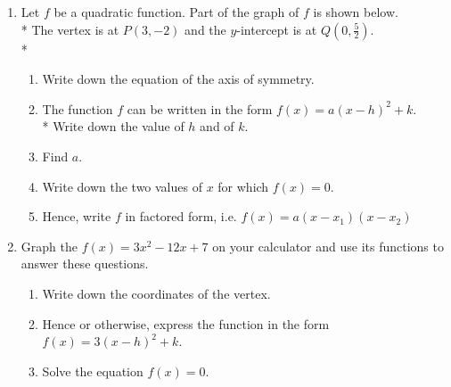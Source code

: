\documentclass[12pt, twoside]{article}
\begin{document}
\begin{enumerate}%
\subsubsection*{5.3 Do Now: Completing the square of quadratic functions}
  \item Let $f$ be a quadratic function. Part of the graph of $f$ is shown below.\\*
  The vertex is at $P(3,-2)$ and the $y$-intercept is at $\displaystyle Q(0, \frac{5}{2})$.\\*
    \begin{center}
    \end{center}
    \begin{enumerate}[itemsep=1cm]
        \item Write down the equation of the axis of symmetry.
        \item The function $f$ can be written in the form $f(x)=a(x-h)^2 +k$. \\*
        Write down the value of $h$ and of $k$.
        \item Find $a$.
        \item Write down the two values of $x$ for which $f(x)=0$.
        \item Hence, write $f$ in factored form, i.e. $f(x)=a(x-x_1)(x-x_2)$
    \end{enumerate}

\newpage
\item Graph the $f(x)=3x^2-12x+7$ on your calculator and use its functions to answer these questions. 
\begin{enumerate}[itemsep=1cm]
    \item Write down the coordinates of the vertex.
    \item Hence or otherwise, express the function in the form $f(x)=3(x-h)^2 +k$.
    \item Solve the equation  $f(x)=0$.
\end{enumerate} \vspace{0.5cm}


\end{enumerate}
\end{document}
